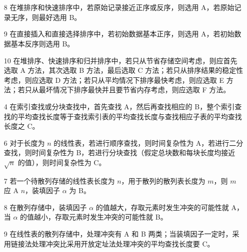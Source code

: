 \documentclass[UTF8]{ctexart}
\begin{document}
\section{}
\begin{enumerate}
	\item[8] 在堆排序和快速排序中，若原始记录接近正序或反序，则选用 A，若原始记录无序，则最好选用 B。
	
	\item[9] 在直接插入和直接选择排序中，若初始数据基本正序，则选用 A，若初始数据基本反序则选用 B。
	
	\item[10] 在堆排序、快速排序和归并排序中，若只从节省存储空间考虑，则应首先选取 A 方法，其次选取 B 方法，最后选取 C 方法；若只从排序结果的稳定性考虑，则应选取 D 方法；若只从平均情况下排序最快考虑，则应选取 E 方法；若只从最坏情况下排序最快并且要节省内存考虑，则应选取 F 方法。
	
	\item[4] 在索引查找或分块查找中，首先查找 A，然后再查找相应的 B，整个索引查找的平均查找长度等于查找索引表的平均查找长度与查找相应子表的平均查找长度之 C。
	
	\item[6] 对于长度为 $n$ 的线性表，若进行顺序查找，则时间复杂性为 A，若进行二分查找，则时间复杂性为 B，若进行分块查找（假定总块数和每块长度均接近 $\sqrt{n}$ 的值），则时间复杂性为 C。
	
	\item[7] 若一个待散列存储的线性表长度为 $n$，用于散列的散列表长度为 $m$，则 $m$ 应 A $n$，装填因子 $\alpha$ 为 B。
	
	\item[8] 在散列存储中，装填因子 $\alpha$ 的值越大，存取元素时发生冲突的可能性就 A，当 $\alpha$ 的值越小，存取元素时发生冲突的可能性就 B。
	
	\item[9] 在线性表的散列存储中，处理冲突有 A 和 B 两类；当装填因子一定时，采用链接法处理冲突比采用开放定址法处理冲突的平均查找长度要 C。
	

	
\end{enumerate}
\end{document}
